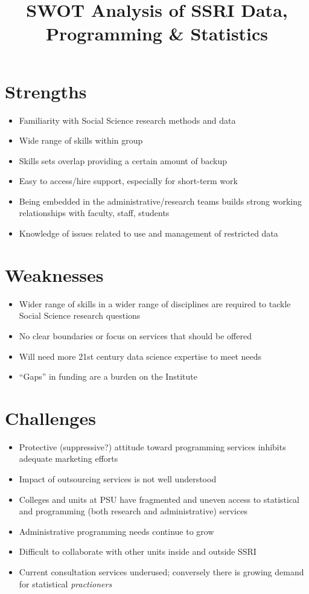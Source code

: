 \documentclass{article}
\begin{document}

\title{SWOT Analysis of SSRI Data, Programming \& Statistics}
\maketitle
\section*{Strengths}
\begin{itemize}
  \item Familiarity with Social Science research methods and data
  \item Wide range of skills within group
  \item Skills sets overlap providing a certain amount of backup 
  \item Easy to access/hire support, especially for short-term work 
  \item Being embedded in the administrative\slash research teams builds strong working relationships with faculty, staff, students
  \item Knowledge of issues related to use and management of restricted data
\end{itemize}  
\section*{Weaknesses}
\begin{itemize}
  \item Wider range of skills in a wider range of disciplines are required to tackle Social Science research questions
  \item No clear boundaries or focus on services that should be offered 
  \item Will need more 21st century data science expertise to meet needs
  \item ``Gaps'' in funding are a burden on the Institute 
\end{itemize}
\section*{Challenges}
\begin{itemize}
  \item Protective (suppressive?) attitude toward programming services inhibits adequate marketing efforts
  \item Impact of outsourcing services is not well understood
  \item Colleges and units at PSU have fragmented and uneven access to statistical and programming (both research and administrative) services 
  \item Administrative programming needs continue to grow 
  \item Difficult to collaborate with other units inside and outside SSRI
  \item Current consultation services underused; conversely there is growing demand for statistical \emph{practioners}
\end{itemize}
\end{document}
